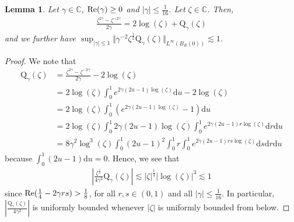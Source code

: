 \documentclass[11pt,reqno]{amsproc}
\newtheorem{lemma}[proposition]{Lemma}
\theoremstyle{definition}
\numberwithin{equation}{section}
\newcommand{\C}{{\mathbb C}}
\renewcommand{\d}{\mathrm{d}}
\def\Re{{\rm Re}}
\begin{document}
\begin{lemma}\label{lemma:secondgammalog}
Let $\gamma\in \C$, $\Re(\gamma)\geq 0$ and $|\gamma|\leq \tfrac{1}{16}$. Let $\zeta\in \C$. Then,
\begin{align*}
\frac{\zeta^{2\gamma} - \zeta^{-2\gamma} }{2\gamma} = 2 \log(\zeta) + \mathrm{Q}_{\gamma}(\zeta)
\end{align*}
and we further have $\sup_{|\gamma|\leq 1} \Vert \gamma^{-2} \zeta^\frac12 \mathrm{Q}_\gamma (\zeta) \Vert_{L^\infty(B_R(0))}\lesssim 1$.
\end{lemma}

\begin{proof}
We note that 
\begin{align*}
\mathrm{Q}_{\gamma}(\zeta) &= \frac{\zeta^{2\gamma} - \zeta^{-2\gamma} }{2\gamma} - 2 \log(\zeta) \\
&= 2\log(\zeta) \int_0^1  e^{2\gamma(2u-1)\log(\zeta)}\d u - 2\log(\zeta) \\
&= 2\log(\zeta)\int_0^1 \left( e^{2\gamma(2u-1)\log(\zeta)} -1\right) \d u \\
&= 2\log(\zeta)\int_0^1 2\gamma(2u-1)\log(\zeta) \int_0^1 e^{2\gamma(2u-1) r \log(\zeta)} \d r \d u \\
&= 8\gamma^2 \log^3(\zeta) \int_0^1(2u-1)^2\int_0^1 r \int_0^1 e^{2\gamma(2u-1)rs\log(\zeta)}\d s \d r \d u
\end{align*}
because $\int_0^1(2u-1)\d u =0$. Hence, we see that 
\begin{align*}
\left| \frac{\zeta^\frac12}{4\gamma^2} \mathrm{Q}_{\gamma}(\zeta) \right| \lesssim |\zeta|^\frac14|\log(\zeta)|^3\lesssim 1
\end{align*}
since $\Re(\tfrac14-2\gamma r s)>\tfrac18$, for all $r,s\in(0,1)$ and all $|\gamma|\leq \tfrac{1}{16}$.  In particular, $\left| \frac{\mathrm{Q}_{\gamma}(\zeta)}{4\gamma^2}  \right|$ is uniformly bounded whenever $|\zeta|$ is uniformly bounded from below. 
\end{proof}
\end{document}
